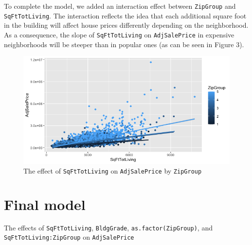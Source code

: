\documentclass[12pt,a4paper]{article}
\begin{document}
	To complete the model, we added an interaction effect between \texttt{ZipGroup} and \texttt{SqFtTotLiving}. The interaction reflects the idea that each additional square foot in the building will affect house prices differently depending on the neighborhood. As a consequence, the slope of \texttt{SqFtTotLiving} on \texttt{AdjSalePrice} in expensive neighborhoods will be steeper than in popular ones (as can be seen in Figure 3).

		

		\begin{figure}[H]
			\centering
			\includegraphics[width=1\linewidth]{Rplot}
			\caption{The effect of \texttt{SqFtTotLiving} on \texttt{AdjSalePrice} by \texttt{ZipGroup}}
			\label{fig:rplot}
		\end{figure}

\vspace{.5cm}

\section{Final model}

The effects of \texttt{SqFtTotLiving}, \texttt{BldgGrade}, \texttt{as.factor(ZipGroup)}, and \texttt{SqFtTotLiving:ZipGroup} on \texttt{AdjSalePrice}

	 
\end{document}
